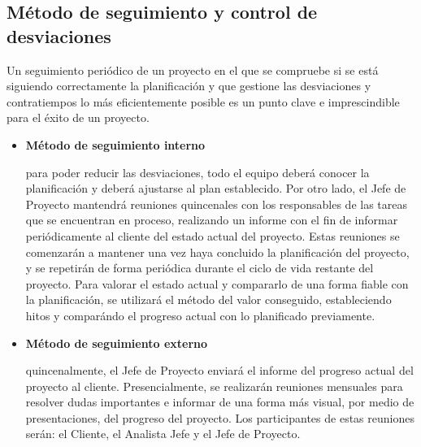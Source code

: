 \subsection{Método de seguimiento y control de desviaciones}
\par Un seguimiento periódico de un proyecto en el que se compruebe si se está siguiendo correctamente la planificación y que gestione las desviaciones y contratiempos lo más eficientemente posible es un punto clave e imprescindible para el éxito de un proyecto.
\begin{itemize}[-]
\item \textbf{Método de seguimiento interno}
\par para poder reducir las desviaciones, todo el equipo deberá conocer la planificación y deberá ajustarse al plan establecido. Por otro lado, el Jefe de Proyecto mantendrá reuniones quincenales con los responsables de las tareas que se encuentran en proceso, realizando un informe con el fin de informar periódicamente al cliente del estado actual del proyecto. Estas reuniones se comenzarán a mantener una vez haya concluido la planificación del proyecto, y se repetirán de forma periódica durante el ciclo de vida restante del proyecto. Para valorar el estado actual y compararlo de una forma fiable con la planificación, se utilizará el método del valor conseguido, estableciendo hitos y comparándo el progreso actual con lo planificado previamente.
\item \textbf{Método de seguimiento externo}
\par quincenalmente, el Jefe de Proyecto enviará el informe del progreso actual del proyecto al cliente. Presencialmente, se realizarán reuniones mensuales para resolver dudas importantes e informar de una forma más visual, por medio de presentaciones, del progreso del proyecto. Los participantes de estas reuniones serán: el Cliente, el Analista Jefe y el Jefe de Proyecto.
\end{itemize}
